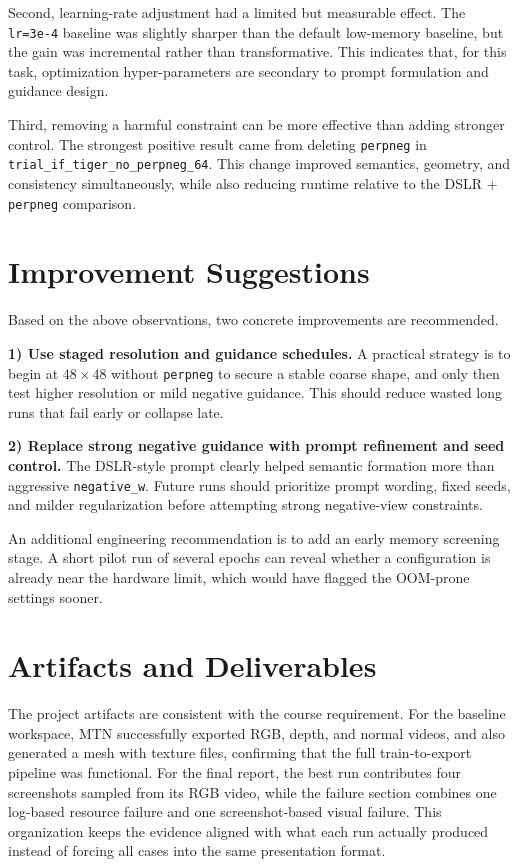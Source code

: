 \documentclass[sigconf,nonacm]{acmart}
\begin{document}
Second, learning-rate adjustment had a limited but measurable effect. The \texttt{lr=3e-4} baseline was slightly sharper than the default low-memory baseline, but the gain was incremental rather than transformative. This indicates that, for this task, optimization hyper-parameters are secondary to prompt formulation and guidance design.

Third, removing a harmful constraint can be more effective than adding stronger control. The strongest positive result came from deleting \texttt{perpneg} in \texttt{trial\_if\_tiger\_no\_perpneg\_64}. This change improved semantics, geometry, and consistency simultaneously, while also reducing runtime relative to the DSLR + \texttt{perpneg} comparison.

\section{Improvement Suggestions}
Based on the above observations, two concrete improvements are recommended.

\noindent\textbf{1) Use staged resolution and guidance schedules.} A practical strategy is to begin at $48\times48$ without \texttt{perpneg} to secure a stable coarse shape, and only then test higher resolution or mild negative guidance. This should reduce wasted long runs that fail early or collapse late.

\noindent\textbf{2) Replace strong negative guidance with prompt refinement and seed control.} The DSLR-style prompt clearly helped semantic formation more than aggressive \texttt{negative\_w}. Future runs should prioritize prompt wording, fixed seeds, and milder regularization before attempting strong negative-view constraints.

An additional engineering recommendation is to add an early memory screening stage. A short pilot run of several epochs can reveal whether a configuration is already near the hardware limit, which would have flagged the OOM-prone settings sooner.

\section{Artifacts and Deliverables}
The project artifacts are consistent with the course requirement. For the baseline workspace, MTN successfully exported RGB, depth, and normal videos, and also generated a mesh with texture files, confirming that the full train-to-export pipeline was functional. For the final report, the best run contributes four screenshots sampled from its RGB video, while the failure section combines one log-based resource failure and one screenshot-based visual failure. This organization keeps the evidence aligned with what each run actually produced instead of forcing all cases into the same presentation format.
\end{document}
